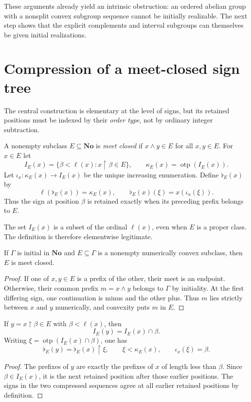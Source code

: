 \documentclass[11pt]{article}
\theoremstyle{definition}
\theoremstyle{remark}
\newcommand{\No}{\ensuremath{\mathbf{No}}}
\newcommand{\len}{\ell}
\newcommand{\otp}{\operatorname{otp}}
\newcommand{\cmp}[1]{\flat_{#1}}
\begin{document}
These arguments already yield an intrinsic obstruction: an ordered
abelian group with a nonsplit convex subgroup sequence cannot be
initially realizable. The next step shows that the explicit complements
and interval subgroups can themselves be given initial realizations.

\section{Compression of a meet-closed sign tree}\label{isg:cf:sec:compression}

The central construction is elementary at the level of signs, but its
retained positions must be indexed by their \emph{order type}, not by
ordinary integer subtraction.

\begin{definition}\label{isg:cf:def:compression}
A nonempty subclass $E\subseteq\No$ is \emph{meet closed} if
$x\wedge y\in E$ for all $x,y\in E$. For $x\in E$ let
\[
 I_E(x)=\{\beta<\len(x):x\restriction\beta\in E\},
 \qquad \kappa_E(x)=\otp(I_E(x)).
\]
Let $\iota_x:\kappa_E(x)\to I_E(x)$ be the unique increasing enumeration.
Define $\cmp E(x)$ by
\begin{equation}\label{isg:cf:eq:compression}
 \len(\cmp E(x))=\kappa_E(x),\qquad
 \cmp E(x)(\xi)=x(\iota_x(\xi)).
\end{equation}
Thus the sign at position $\beta$ is retained exactly when its preceding
prefix belongs to $E$.
\end{definition}

The set $I_E(x)$ is a subset of the ordinal $\len(x)$, even when $E$ is
a proper class. The definition is therefore elementwise legitimate.

\begin{lemma}\label{isg:cf:lem:meetclosed}
If $\Gamma$ is initial in $\No$ and $E\subseteq\Gamma$ is a nonempty
numerically convex subclass, then $E$ is meet closed.
\end{lemma}
\begin{proof}
If one of $x,y\in E$ is a prefix of the other, their meet is an endpoint.
Otherwise, their common prefix $m=x\wedge y$ belongs to $\Gamma$ by
initiality. At the first differing sign, one continuation is minus and
the other plus. Thus $m$ lies strictly between $x$ and $y$ numerically,
and convexity puts $m$ in $E$.
\end{proof}

\begin{lemma}\label{isg:cf:lem:retainedprefix}
If $y=x\restriction\beta\in E$ with $\beta<\len(x)$, then
\[
 I_E(y)=I_E(x)\cap\beta.
\]
Writing $\xi=\otp(I_E(x)\cap\beta)$, one has
\[
 \cmp E(y)=\cmp E(x)\restriction\xi,
 \qquad \xi<\kappa_E(x),\qquad \iota_x(\xi)=\beta.
\]
\end{lemma}
\begin{proof}
The prefixes of $y$ are exactly the prefixes of $x$ of length less than
$\beta$. Since $\beta\in I_E(x)$, it is the next retained position after
those earlier positions. The signs in the two compressed sequences
agree at all earlier retained positions by definition.
\end{proof}
\end{document}

